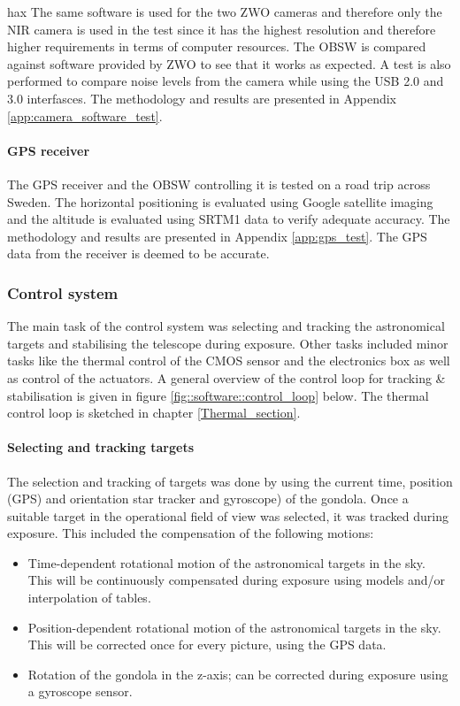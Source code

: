 hax The same software is used for the two ZWO cameras and therefore only the NIR camera is used in the test since it has the highest resolution and therefore higher requirements in terms of computer resources. The OBSW is compared against software provided by ZWO to see that it works as expected. A test is also performed to compare noise levels from the camera while using the USB 2.0 and 3.0 interfasces. The methodology and results are presented in Appendix \ref{app:camera_software_test}.

\paragraph{GPS receiver}

The GPS receiver and the OBSW controlling it is tested on a road trip across Sweden. The horizontal positioning is evaluated using Google satellite imaging and the altitude is evaluated using SRTM1 data to verify adequate accuracy. The methodology and results are presented in Appendix \ref{app:gps_test}. The GPS data from the receiver is deemed to be accurate.


\subsubsection{Control system}
The main task of the control system was selecting and tracking the astronomical targets and stabilising the telescope during exposure. Other tasks included minor tasks like the thermal control of the CMOS sensor and the electronics box as well as control of the actuators. A general overview of the control loop for tracking \& stabilisation is given in figure  \mbox{\ref{fig::software::control_loop}} below. The thermal control loop is sketched in chapter \mbox{\ref{Thermal_section}}.

\paragraph{Selecting and tracking targets}

The selection and tracking of targets was done by using the current time, position (GPS) and orientation star tracker and gyroscope) of the gondola. Once a suitable target in the operational field of view was selected, it was tracked during exposure. This included the compensation of the following motions:
\begin{itemize}
	\item Time-dependent rotational motion of the astronomical targets in the sky. This will be continuously compensated during exposure using models and/or interpolation of tables.
	\item Position-dependent rotational motion of the astronomical targets in the sky. This will be corrected once for every picture, using the GPS data.
	\item Rotation of the gondola in the z-axis; can be corrected during exposure using a gyroscope sensor.
\end{itemize}

